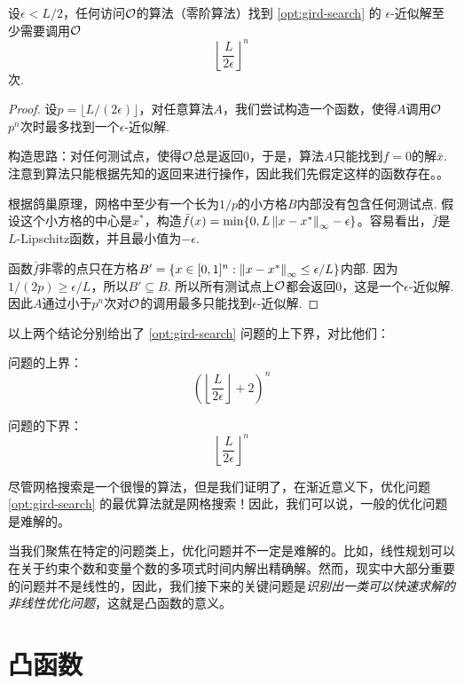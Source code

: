 \begin{theorem}\label{thm:gird-search-lower-bound}
    设$\epsilon<L/2$，任何访问$\mathcal{O}$的算法（零阶算法）找到 \eqref{opt:gird-search} 的 $\epsilon$-近似解至少需要调用$\mathcal{O}$
    \[\left\lfloor\frac{L}{2\epsilon}\right\rfloor^n\]
    次.
\end{theorem}
\begin{proof}
设$p=\lfloor L/(2\epsilon)\rfloor$，对任意算法$A$，我们尝试构造一个函数，使得$A$调用$\mathcal{O}$ $p^n$次时最多找到一个$\epsilon$-近似解.

构造思路：对任何测试点，使得$\mathcal{O}$总是返回$0$，于是，算法$A$只能找到$f=0$的解$\bar{x}$. 注意到算法只能根据先知的返回来进行操作，因此我们先假定这样的函数存在。。

根据鸽巢原理，网格中至少有一个长为$1/p$的小方格$B$内部没有包含任何测试点. 假设这个小方格的中心是$x^*$，构造$\bar f(x)=\min\{0,L\left\|x-x^*\right\|_\infty-\epsilon\}$。容易看出，$\bar f$是$L$-Lipschitz函数，并且最小值为$-\epsilon$.

函数$\bar f$非零的点只在方格$B'=\{x\in[0,1]^n:\left\|x-x^*\right\|_\infty\leq\epsilon/L\}$内部. 因为$1/(2p)\geq \epsilon/L$，所以$B'\subseteq B$. 所以所有测试点上$\mathcal{O}$都会返回$0$，这是一个$\epsilon$-近似解. 因此$A$通过小于$p^n$次对$\mathcal{O}$的调用最多只能找到$\epsilon$-近似解.
\end{proof}

以上两个结论分别给出了 \eqref{opt:gird-search} 问题的上下界，对比他们：
\begin{center}
\begin{minipage}[t]{0.4\textwidth}
问题的上界：
\[\left(\left\lfloor\frac{L}{2\epsilon}\right\rfloor+2\right)^n\]
\end{minipage}
\begin{minipage}[t]{0.4\textwidth}
问题的下界：
    \[\left\lfloor\frac{L}{2\epsilon}\right\rfloor^n\]
\end{minipage}
\end{center}
尽管网格搜索是一个很慢的算法，但是我们证明了，在渐近意义下，优化问题 \eqref{opt:gird-search} 的最优算法就是网格搜索！因此，我们可以说，一般的优化问题是难解的。

当我们聚焦在特定的问题类上，优化问题并不一定是难解的。比如，线性规划可以在关于约束个数和变量个数的多项式时间内解出精确解。然而，现实中大部分重要的问题并不是线性的，因此，我们接下来的关键问题是\textit{识别出一类可以快速求解的非线性优化问题}，这就是凸函数的意义。


\section{凸函数}

